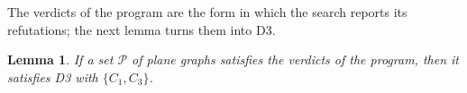 \documentclass[12pt]{amsart}
\newtheorem{lemma}[theorem]{Lemma}
\theoremstyle{definition}
\theoremstyle{plain}
\theoremstyle{definition}
\newcommand{\CI}{C_1}
\newcommand{\CIII}{C_3}
\newcommand{\leanmap}[1]{\ignorespaces}
\begin{document}
The verdicts of the program are the form in which the search reports its refutations; the next lemma turns them into D3.

\begin{lemma}\label{lem:verdicts}\leanmap{Tammes15.PaperSteps.killed_of_progKilled, Tammes15.PaperSteps.exists_shift_data, Tammes15.PaperSteps.relSys_relabel, Tammes15.PaperSteps.glueY_relabel, Tammes15.PaperSteps.pairFires_of_equiv, Tammes15.PaperSteps.localFires_of_equiv, Tammes15.PaperSteps.glueY_theta, Tammes15.PaperSteps.frameN_theta, Tammes15.PaperSteps.free_angle_sum, Tammes15.PaperSteps.localFires_of_tieFires, Tammes15.PaperSteps.inTieBoxes_pt, Tammes15.PaperSteps.tie_idx, Tammes15.PaperSteps.normalize_isometry}
If a set $\mathcal P$ of plane graphs satisfies the verdicts of the program, then it satisfies D3 with $\{\CI,\CIII\}$.
\end{lemma}
\end{document}
